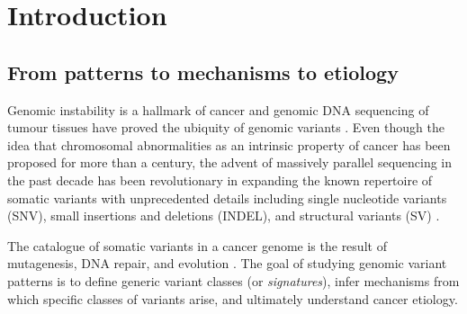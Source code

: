 \documentclass[phd,tocprelim]{cornell}
\begin{document}
\contentspage
\tablelistpage
\figurelistpage


\normalspacing \setcounter{page}{1} 
\pagestyle{cornell} \addtolength{\parskip}{0.5\baselineskip}


\chapter{Introduction}


\section{From patterns to mechanisms to etiology}
Genomic instability is a hallmark of cancer \cite{Hanahan2011-ni} and genomic DNA sequencing of tumour tissues have proved the ubiquity of genomic variants \cite{pcawg_marker2020-yi}. Even though the idea that chromosomal abnormalities as an intrinsic property of cancer has been proposed \cite{Boveri2008-rl} for more than a century, the advent of massively parallel sequencing in the past decade has been revolutionary in expanding the known repertoire of somatic variants with unprecedented details including single nucleotide variants (SNV), small insertions and deletions (INDEL), and structural variants (SV) \cite{Meyerson2010-xc}.

The catalogue of somatic variants in a cancer genome is the result of mutagenesis, DNA repair, and evolution \cite{Stratton2009-ty}. The goal of studying genomic variant patterns is to define generic variant classes (or \textit{signatures}), infer mechanisms from which specific classes of variants arise, and ultimately understand cancer etiology.
\end{document}
